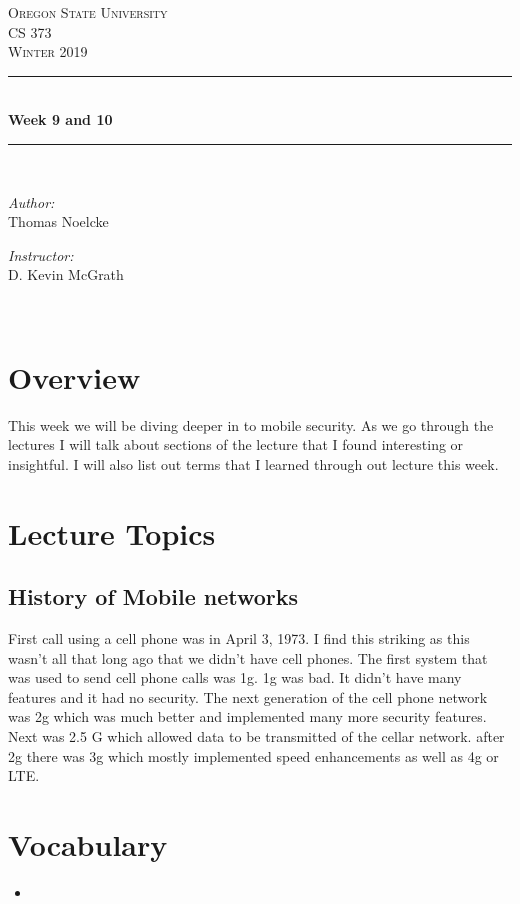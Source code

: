 \documentclass[letterpaper, onecolumn,10pt]{IEEEtran}
\begin{document}
    \begin{titlepage}
    \newcommand{\HRule}{\rule{\linewidth}{0.5mm}}
    \center
    \textsc{\Large Oregon State University}\\[1.5cm]
    \textsc{\Large CS 373}\\[0.5cm]
    \textsc{\Large Winter 2019}\\[0.5cm]
    \HRule \\[0.4cm]
    { \huge \bfseries Week 9 and 10}\\[0.4cm] %
    \HRule \\[1.5cm]
    \begin{minipage}{0.4\textwidth}
        \begin{flushleft} \large
        \emph{Author:}\\
        Thomas Noelcke
        \end{flushleft}
    \end{minipage}
    \begin{minipage}{0.4\textwidth}
        \begin{flushright} \large
        \emph{Instructor:} \\
        D. Kevin McGrath\\
        \end{flushright}
    \end{minipage}\\[2cm]
		\end{titlepage}
		
		
		\section{Overview}
		This week we will be diving deeper in to mobile security. As we go through the lectures I will talk about sections of the lecture that I found interesting or insightful. I will also list out terms that I learned through out lecture this week.\\
		
		\section{Lecture Topics}
		    \subsection{History of Mobile networks}
		    First call using a cell phone was in April 3, 1973. I find this striking as this wasn't all that long ago that we didn't have cell phones. The first system that was used to send cell phone calls was 1g. 1g was bad. It didn't have many features and it had no security. The next generation of the cell phone network was 2g which was much better and implemented many more security features. Next was 2.5 G which allowed data to be transmitted of the cellar network. after 2g there was 3g which mostly implemented speed enhancements as well as 4g or LTE.\\
		    
		     
		    
	    \section{Vocabulary}
	        \begin{itemize}
	            \item 
	        \end{itemize}
			
		
\end{document}
